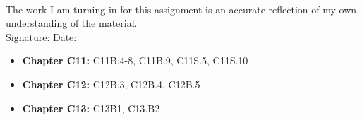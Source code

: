 \documentclass[12pt]{article}
\begin{document}
\\

\bigskip
\bigskip

\noindent The work I am turning in for this assignment is an accurate
reflection of my own understanding of the material.\\[14pt]

\noindent Signature: \underline{\hspace{7cm}} \hspace{1cm} Date:
\underline{\hspace{5cm}}\\



\hline 

\medskip
\begin{itemize}
\item {\bf Chapter C11:} C11B.4-8, C11B.9, C11S.5, C11S.10
\item {\bf Chapter C12:} C12B.3, C12B.4, C12B.5
\item {\bf Chapter C13:} C13B1, C13.B2
\end{itemize}
\end{document}
